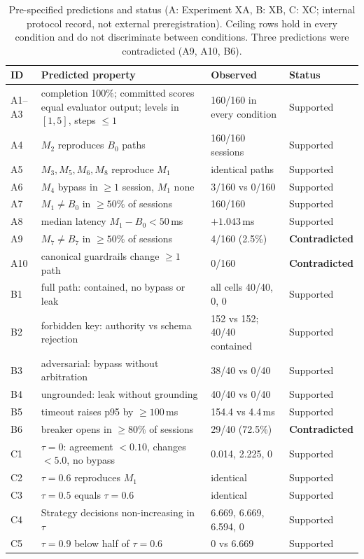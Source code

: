\documentclass[runningheads,a4paper]{llncs}
\begin{document}
\begin{table}[!htbp]
\caption{Pre-specified predictions and status (A: Experiment XA, B: XB, C: XC; internal protocol record, not external preregistration). Ceiling rows hold in every condition and do not discriminate between conditions. Three predictions were contradicted (A9, A10, B6).}
\label{tab:pred}
\centering\scriptsize
\begin{tabular}{@{}L{0.9cm}L{5.2cm}L{3.4cm}L{1.9cm}@{}}
\toprule
ID & Predicted property & Observed & Status \\
\midrule
A1--A3 & completion 100\%; committed scores equal evaluator output; levels in $[1,5]$, steps $\le1$ & 160/160 in every condition & Supported \\
A4 & $M_2$ reproduces $B_0$ paths & 160/160 sessions & Supported \\
A5 & $M_3,M_5,M_6,M_8$ reproduce $M_1$ & identical paths & Supported \\
A6 & $M_4$ bypass in $\ge1$ session, $M_1$ none & 3/160 vs 0/160 & Supported \\
A7 & $M_1\ne B_0$ in $\ge50\%$ of sessions & 160/160 & Supported \\
A8 & median latency $M_1-B_0<50$\,ms & $+1.043$\,ms & Supported \\
A9 & $M_7\ne B_7$ in $\ge50\%$ of sessions & 4/160 (2.5\%) & \textbf{Contradicted} \\
A10 & canonical guardrails change $\ge1$ path & 0/160 & \textbf{Contradicted} \\
B1 & full path: contained, no bypass or leak & all cells 40/40, 0, 0 & Supported \\
B2 & forbidden key: authority vs schema rejection & 152 vs 152; 40/40 contained & Supported \\
B3 & adversarial: bypass without arbitration & 38/40 vs 0/40 & Supported \\
B4 & ungrounded: leak without grounding & 40/40 vs 0/40 & Supported \\
B5 & timeout raises p95 by $\ge100$\,ms & 154.4 vs 4.4\,ms & Supported \\
B6 & breaker opens in $\ge80\%$ of sessions & 29/40 (72.5\%) & \textbf{Contradicted} \\
C1 & $\tau=0$: agreement $<0.10$, changes $<5.0$, no bypass & 0.014, 2.225, 0 & Supported \\
C2 & $\tau=0.6$ reproduces $M_1$ & identical & Supported \\
C3 & $\tau=0.5$ equals $\tau=0.6$ & identical & Supported \\
C4 & Strategy decisions non-increasing in $\tau$ & 6.669, 6.669, 6.594, 0 & Supported \\
C5 & $\tau=0.9$ below half of $\tau=0.6$ & 0 vs 6.669 & Supported \\
\bottomrule
\end{tabular}
\end{table}
\end{document}
